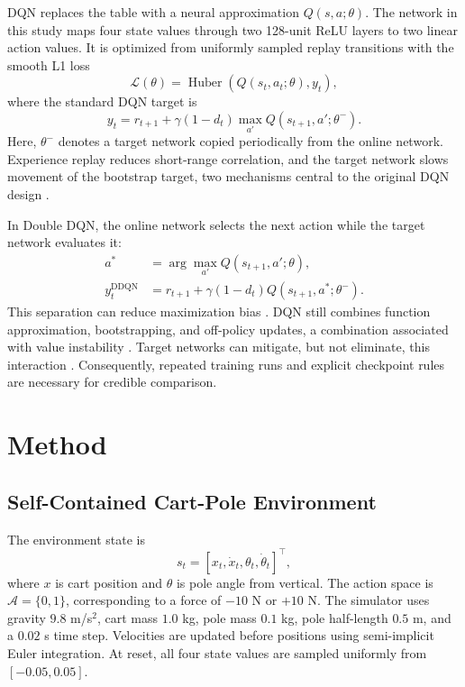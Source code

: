 \documentclass[conference]{IEEEtran}
\begin{document}
DQN replaces the table with a neural approximation
$Q(s,a;\theta)$. The network in this study maps four state values through two
128-unit ReLU layers to two linear action values. It is optimized from
uniformly sampled replay transitions with the smooth L1 loss
\begin{equation}
\mathcal{L}(\theta)=
\operatorname{Huber}\!\left(
Q(s_t,a_t;\theta), y_t
\right),
\end{equation}
where the standard DQN target is
\begin{equation}
y_t=r_{t+1}+\gamma(1-d_t)
\max_{a'}Q(s_{t+1},a';\theta^-).
\label{eq:dqn}
\end{equation}
Here, $\theta^-$ denotes a target network copied periodically from the online
network. Experience replay reduces short-range correlation, and the target
network slows movement of the bootstrap target, two mechanisms central to
the original DQN design \cite{mnih2015dqn}.

In Double DQN, the online network selects the next action while the target
network evaluates it:
\begin{align}
a^*&=\arg\max_{a'}Q(s_{t+1},a';\theta),\\
y_t^{\mathrm{DDQN}}&=r_{t+1}+\gamma(1-d_t)
Q(s_{t+1},a^*;\theta^-).
\label{eq:ddqn}
\end{align}
This separation can reduce maximization bias
\cite{vanhasselt2016double}. DQN still combines function approximation,
bootstrapping, and off-policy updates, a combination associated with value
instability \cite{vanhasselt2018triad}. Target networks can mitigate, but not
eliminate, this interaction \cite{zhang2021target}. Consequently, repeated
training runs and explicit checkpoint rules are necessary for credible
comparison.

\section{Method}

\subsection{Self-Contained Cart-Pole Environment}

The environment state is
\begin{equation}
s_t=[x_t,\dot{x}_t,\theta_t,\dot{\theta}_t]^\top,
\end{equation}
where $x$ is cart position and $\theta$ is pole angle from vertical. The
action space is $\mathcal{A}=\{0,1\}$, corresponding to a force of $-10$ N or
$+10$ N. The simulator uses gravity $9.8$ m/s$^2$, cart mass $1.0$ kg, pole
mass $0.1$ kg, pole half-length $0.5$ m, and a $0.02$ s time step.
Velocities are updated before positions using semi-implicit Euler
integration. At reset, all four state values are sampled uniformly from
$[-0.05,0.05]$.
\end{document}
